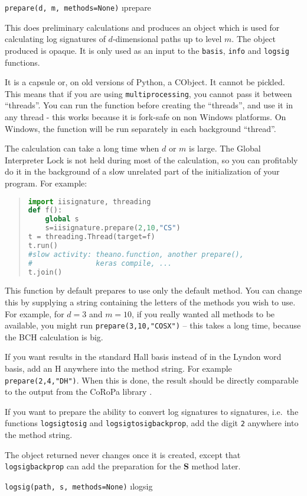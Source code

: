 \documentclass[a4paper]{extarticle}
\newenvironment{defn}{\begin{adjustwidth}{1cm}{}\ignorespaces}{\end{adjustwidth}\ignorespacesafterend}
\begin{document}
\verb!prepare(d, m, methods=None)! \i{prepare}
\nopagebreak \begin{defn}\nopagebreak 
This does preliminary calculations and produces an object which is used for calculating log signatures of $d$-dimensional paths up to level $m$. The object produced is opaque. It is only used as an input to the \verb|basis|, \verb|info| and \verb|logsig| functions. 

It is a capsule or, on old versions of Python, a CObject. It cannot be pickled. This means that if you are using \verb|multiprocessing|, you cannot pass it between ``threads''. You can run the function before creating the ``threads'', and use it in any thread - this works because it is fork-safe on non Windows platforms. On Windows, the function will be run separately in each background ``thread''.

The calculation can take a long time when $d$ or $m$ is large. The Global Interpreter Lock is not held during most of the calculation, so you can profitably do it in the background of a slow unrelated part of the initialization of your program. For example:
\begin{quotation}
\begin{lstlisting}[language=Python,keywordstyle=\bf]
import iisignature, threading
def f():
	global s
	s=iisignature.prepare(2,10,"CS")
t = threading.Thread(target=f)
t.run()
#slow activity: theano.function, another prepare(), 
#               keras compile, ...
t.join()
\end{lstlisting}
\end{quotation}

This function by default prepares to use only the default method. You can change this by supplying a string containing the letters of the methods you wish to use. For example, for $d=3$ and $m=10$, if you really wanted all methods to be available, you might run \verb|prepare(3,10,"COSX")| -- this takes a long time, because the BCH calculation is big. 

If you want results in the standard Hall basis instead of in the Lyndon word basis, add an H anywhere into the method string. For example \verb|prepare(2,4,"DH")|. When this is done, the result should be directly comparable to the output from the CoRoPa library \cite{coropa}.

If you want to prepare the ability to convert log signatures to signatures,
i.e.~the functions \texttt{logsigtosig} and \texttt{logsigtosigbackprop},
add the digit \verb!2! anywhere into the method string.

The object returned never changes once it is created, except that \verb!logsigbackprop! can add the preparation for the \textbf{S} method later.

\end{defn}
\verb!logsig(path, s, methods=None)! \i{logsig}
\end{document}

